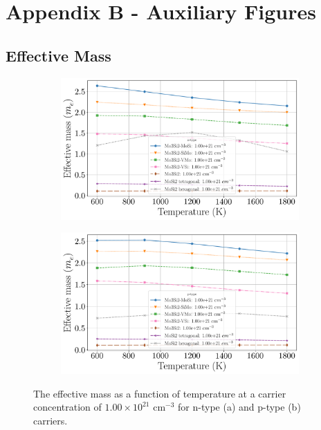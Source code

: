 \documentclass[7.5pt]{article}
\theoremstyle{plain}
\theoremstyle{definition}
\newcommand{\<}{\langle}
\renewcommand{\>}{\rangle}
\begin{document}
\cleardoublepage
\pagebreak
\section{Appendix B - Auxiliary Figures}

\setcounter{figure}{0}
\renewcommand{\thefigure}{\thesection.\arabic{figure}}%

\subsection{Effective Mass}
\label{appendix:effective-mass}

\begin{figure}[b!]
\centering
\begin{subfigure}{.5\textwidth}
  \centering
  \includegraphics[width=\linewidth]{allmats_E_temp_doping_n}
  \caption{}
  \label{fig:sub1}
\end{subfigure}%
\begin{subfigure}{.5\textwidth}
  \centering
  \includegraphics[width=\linewidth]{allmats_E_temp_doping_p}
  \caption{}
  \label{fig:sub2}
\end{subfigure}
\caption{The effective mass as a function of temperature at a carrier concentration of $1.00 \times 10^{21}$ cm$^{-3}$ for n-type (a) and p-type (b) carriers.}
\label{fig:E-Temp}
\end{figure}
\end{document}
